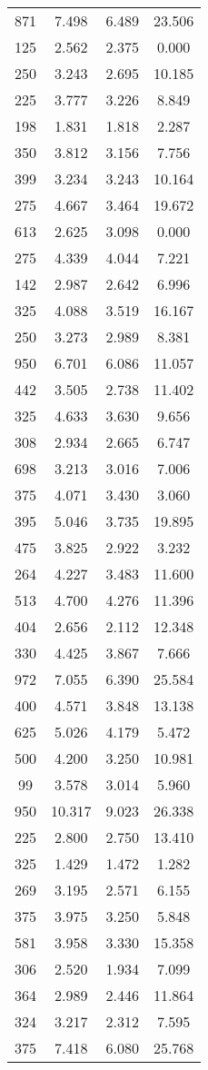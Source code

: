 \begin{longtable}{cccc}
871&7.498&6.489&23.506 \\
125&2.562&2.375&0.000 \\
250&3.243&2.695&10.185 \\
225&3.777&3.226&8.849 \\
198&1.831&1.818&2.287 \\
350&3.812&3.156&7.756 \\
399&3.234&3.243&10.164 \\
275&4.667&3.464&19.672 \\
613&2.625&3.098&0.000 \\
275&4.339&4.044&7.221 \\
142&2.987&2.642&6.996 \\
325&4.088&3.519&16.167 \\
250&3.273&2.989&8.381 \\
950&6.701&6.086&11.057 \\
442&3.505&2.738&11.402 \\
325&4.633&3.630&9.656 \\
308&2.934&2.665&6.747 \\
698&3.213&3.016&7.006 \\
375&4.071&3.430&3.060 \\
395&5.046&3.735&19.895 \\
475&3.825&2.922&3.232 \\
264&4.227&3.483&11.600 \\
513&4.700&4.276&11.396 \\
404&2.656&2.112&12.348 \\
330&4.425&3.867&7.666 \\
972&7.055&6.390&25.584 \\
400&4.571&3.848&13.138 \\
625&5.026&4.179&5.472 \\
500&4.200&3.250&10.981 \\
99&3.578&3.014&5.960 \\
950&10.317&9.023&26.338 \\
225&2.800&2.750&13.410 \\
325&1.429&1.472&1.282 \\
269&3.195&2.571&6.155 \\
375&3.975&3.250&5.848 \\
581&3.958&3.330&15.358 \\
306&2.520&1.934&7.099 \\
364&2.989&2.446&11.864 \\
324&3.217&2.312&7.595 \\
375&7.418&6.080&25.768 \\

\end{longtable}
